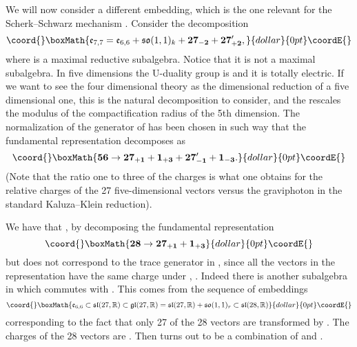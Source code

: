\documentclass[a4paper,12pt]{article}
\begin{document}
 We will now consider a different embedding, which is
the one relevant for the Scherk--Schwarz mechanism \cite{adfl2}.  Consider the
decomposition $$\coord{}\boxMath{\fe_{7,7}=\fe_{6,6}+\fso(1,1)_{k} +
\mathbf{27_{-2}}+\mathbf{27'_{+2}},}{dollar}{0pt}\coordE{}$$ where
\coordHE{} is a maximal reductive
subalgebra. Notice that it is not a
maximal subalgebra.  In five dimensions the U-duality group is
\coordHE{} and it is totally electric. If we want to see the four
dimensional theory as the dimensional reduction of a five
dimensional one, this is the natural decomposition to consider,
and the \coordHE{} rescales the modulus of the
compactification radius of the 5th dimension. The normalization of
the generator of \coordHE{} has been chosen in such way that
the fundamental representation decomposes as
$$\coord{}\boxMath{\mathbf{56}\rightarrow \mathbf{27_{+1}}
+\mathbf{1_{+3}}+\mathbf{27'_{-1}}+\mathbf{1_{-3}}. }{dollar}{0pt}\coordE{}$$ (Note that
the ratio one to three of the \coordHE{} charges is what one
obtains for the relative charges of the 27 five-dimensional
vectors versus the graviphoton in the standard Kaluza--Klein
reduction).




 We have that \coordHE{}, by decomposing the fundamental representation
$$\coord{}\boxMath{\mathbf{28}\rightarrow \mathbf{27_{+1}}+\mathbf{1_{+3}}}{dollar}{0pt}\coordE{}$$ but
\coordHE{} does not correspond to the trace
generator \coordHE{} in \coordHE{}, since all the  vectors
in the representation \coordHE{}  have  the same charge under
\coordHE{}, \coordHE{}. Indeed there is
another subalgebra \coordHE{} in \coordHE{} which commutes
with \coordHE{}. This comes from the sequence of embeddings
$$\coord{}\boxMath{\fe_{6,6}\subset\fsl(27,\R)\subset
\fgl(27,\R)=\fsl(27,\R)+\fso(1,1)_r\subset \fsl(28,\R)}{dollar}{0pt}\coordE{}$$
corresponding to the fact that only 27 of the 28 vectors are
transformed by \coordHE{}. The charges of the 28 vectors are
\coordHE{}. Then \coordHE{} turns out
to be a combination of \coordHE{} and \coordHE{}.
\end{document}
